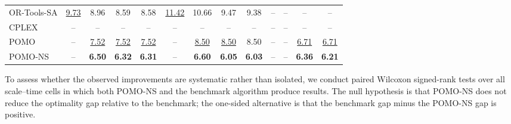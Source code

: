 \documentclass[preprint,12pt,authoryear]{elsarticle}
\theoremstyle{definition}
\begin{document}
\begin{table}[H]
{\begin{tabular}{@{}lcccccccccccc@{}}
OR-Tools-SA & \underline{9.73} & 8.96 & 8.59 & 8.58 & \underline{11.42} & 10.66 & 9.47 & 9.38 & -- & -- & -- & -- \\
CPLEX & -- & -- & -- & -- & -- & -- & -- & -- & -- & -- & -- & -- \\
POMO & -- & \underline{7.52} & \underline{7.52} & \underline{7.52} & -- & \underline{8.50} & \underline{8.50} & 8.50 & -- & -- & \underline{6.71} & \underline{6.71} \\
POMO-NS & -- & \textbf{6.50} & \textbf{6.32} & \textbf{6.31} & -- & \textbf{6.60} & \textbf{6.05} & \textbf{6.03} & -- & -- & \textbf{6.36} & \textbf{6.21} \\
\bottomrule
\end{tabular}%
}
\endgroup
\end{table}


To assess whether the observed improvements are systematic rather than isolated, we conduct paired Wilcoxon signed-rank tests over all scale--time cells in which both POMO-NS and the benchmark algorithm produce results. The null hypothesis is that POMO-NS does not reduce the optimality gap relative to the benchmark; the one-sided alternative is that the benchmark gap minus the POMO-NS gap is positive.

\begin{table}[H]
\centering
\caption{Paired statistical comparison under the same computational budget.}
\label{tab:vrp_statistical_tests}
\begingroup
\small
{}
\endgroup
\end{table}
\end{document}
